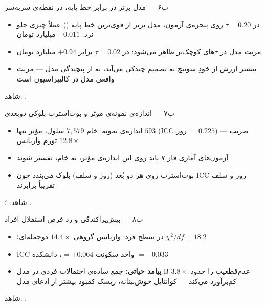 \begin{frame}{پ۶ — مدل برتر در برابر خط پایه، در نقطه‌ی سربه‌سر}
  \begin{itemize}
    \item در $\tau=0.20$ روی پنجره‌ی آزمون، مدل برتر از قوی‌ترین خط پایه () عملاً چیزی
      جلو نزد: $-0.011$ میلیارد تومان
    \item مزیت مدل در $\tau$های کوچک‌تر ظاهر می‌شود: در $\tau=0.02$ برابر $+0.94$ میلیارد
      تومان
    \item بیشتر ارزش از خودِ سوئیچ به تصمیم چندکی می‌آید، نه از پیچیدگی مدل — مزیت واقعی مدل
      در کالیبراسیون است
  \end{itemize}
  {\small شاهد: .}
\end{frame}

\begin{frame}{پ۷ — اندازه‌ی نمونه‌ی مؤثر و بوت‌استرپ بلوکی دوبعدی}
  \begin{itemize}
    \item اندازه‌ی نمونه: خام $7{,}579$ سلول، مؤثر تنها $593$ (ICC روز $=0.225$) — ضریب
      تورم واریانس $12.8\times$
    \item آزمون‌های آماری فاز ۷ باید روی این اندازه‌ی مؤثر، نه خام، تفسیر شوند
    \item بوت‌استرپ روی هر دو بُعد (روز و سلف) بلوک می‌بندد چون ICC روز و سلف تقریباً برابرند
  \end{itemize}
  {\small شاهد: ؛ .}
\end{frame}

\begin{frame}{پ۸ — بیش‌پراکندگی و رد فرض استقلال افراد}
  \begin{itemize}
    \item در سطح فرد: واریانس گروهی $14.4\times$ دوجمله‌ای؛ $\chi^2/df=18.2$
    \item ICC واحد سکونت $=+0.064$، دانشکده $=+0.033$
    \item \textbf{پیامد حیاتی:} جمع ساده‌ی احتمالات فردی در مدل B عدم‌قطعیت را حدود
      $3.8\times$ کم‌برآورد می‌کند — کوانتایل خوش‌بینانه، ریسک کمبود بیشتر از ادعای مدل
  \end{itemize}
  {\small شاهد: .}
\end{frame}


